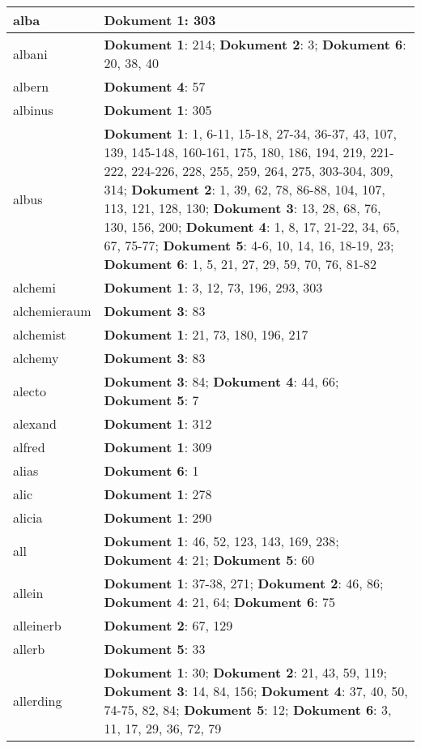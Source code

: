 \documentclass[a5paper]{article}
\begin{document}
\begin{longtable}[l]{|l|p{3in}|}
\hline
alba & \textbf{Dokument 1}: 303 \\
\hline
albani & \textbf{Dokument 1}: 214; \textbf{Dokument 2}: 3; \textbf{Dokument 6}: 20, 38, 40 \\
\hline
albern & \textbf{Dokument 4}: 57 \\
\hline
albinus & \textbf{Dokument 1}: 305 \\
\hline
albus & \textbf{Dokument 1}: 1, 6-11, 15-18, 27-34, 36-37, 43, 107, 139, 145-148, 160-161, 175, 180, 186, 194, 219, 221-222, 224-226, 228, 255, 259, 264, 275, 303-304, 309, 314; \textbf{Dokument 2}: 1, 39, 62, 78, 86-88, 104, 107, 113, 121, 128, 130; \textbf{Dokument 3}: 13, 28, 68, 76, 130, 156, 200; \textbf{Dokument 4}: 1, 8, 17, 21-22, 34, 65, 67, 75-77; \textbf{Dokument 5}: 4-6, 10, 14, 16, 18-19, 23; \textbf{Dokument 6}: 1, 5, 21, 27, 29, 59, 70, 76, 81-82 \\
\hline
alchemi & \textbf{Dokument 1}: 3, 12, 73, 196, 293, 303 \\
\hline
alchemieraum & \textbf{Dokument 3}: 83 \\
\hline
alchemist & \textbf{Dokument 1}: 21, 73, 180, 196, 217 \\
\hline
alchemy & \textbf{Dokument 3}: 83 \\
\hline
alecto & \textbf{Dokument 3}: 84; \textbf{Dokument 4}: 44, 66; \textbf{Dokument 5}: 7 \\
\hline
alexand & \textbf{Dokument 1}: 312 \\
\hline
alfred & \textbf{Dokument 1}: 309 \\
\hline
alias & \textbf{Dokument 6}: 1 \\
\hline
alic & \textbf{Dokument 1}: 278 \\
\hline
alicia & \textbf{Dokument 1}: 290 \\
\hline
all & \textbf{Dokument 1}: 46, 52, 123, 143, 169, 238; \textbf{Dokument 4}: 21; \textbf{Dokument 5}: 60 \\
\hline
allein & \textbf{Dokument 1}: 37-38, 271; \textbf{Dokument 2}: 46, 86; \textbf{Dokument 4}: 21, 64; \textbf{Dokument 6}: 75 \\
\hline
alleinerb & \textbf{Dokument 2}: 67, 129 \\
\hline
allerb & \textbf{Dokument 5}: 33 \\
\hline
allerding & \textbf{Dokument 1}: 30; \textbf{Dokument 2}: 21, 43, 59, 119; \textbf{Dokument 3}: 14, 84, 156; \textbf{Dokument 4}: 37, 40, 50, 74-75, 82, 84; \textbf{Dokument 5}: 12; \textbf{Dokument 6}: 3, 11, 17, 29, 36, 72, 79 \\

\end{longtable}
\end{document}
